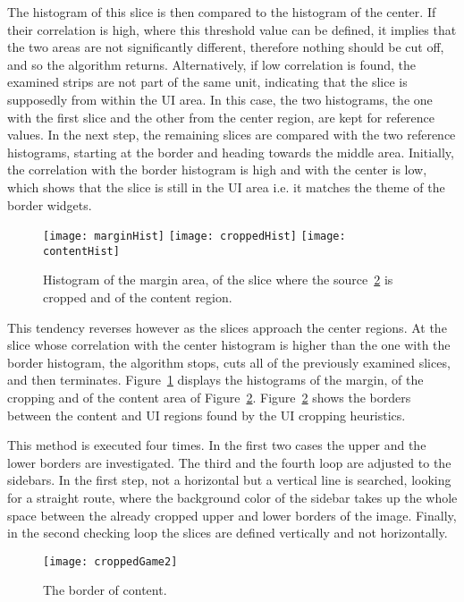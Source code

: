 \documentclass[draft,final]{vutinfth} %
\begin{document}
	The histogram of this slice is then compared to the histogram of the center.
	If their correlation is high, where this threshold value can be defined, it implies that the two areas are not significantly different, therefore nothing should be cut off, and so the algorithm returns.
	Alternatively, if low correlation is found, the examined strips are not part of the same unit, indicating that the slice is supposedly from within the UI area.
	In this case, the two histograms, the one with the first slice and the other from the center region, are kept for reference values.
	In the next step, the remaining slices are compared with the two reference histograms, starting at the border and heading towards the middle area.
	Initially, the correlation with the border histogram is high and with the center is low, which shows that the slice is still in the UI area i.e. it matches the theme of the border widgets.
	\begin{figure}[H]
		\texttt{[image: marginHist]}\hfill
		\texttt{[image: croppedHist]}\hfill
		\texttt{[image: contentHist]}
		\caption{Histogram of the margin area, of the slice where the source~\ref{fig:cropped} is cropped and of the content region.}
		\label{fig:hist}
	\end{figure}
	This tendency reverses however as the slices approach the center regions.
	At the slice whose correlation with the center histogram is higher than the one with the border histogram, the algorithm stops, cuts all of the previously examined slices, and then terminates.
	Figure~\ref{fig:hist} displays the histograms of the margin, of the cropping and of the content area of Figure~\ref{fig:cropped}.
	Figure~\ref{fig:cropped} shows the borders between the content and UI regions found by the UI cropping heuristics.\par 	
	This method is executed four times.
	In the first two cases the upper and the lower borders are investigated.
	The third and the fourth loop are adjusted to the sidebars.
	In the first step, not a horizontal but a vertical line is searched, looking for a straight route, where the background color of the sidebar takes up the whole space between the already cropped upper and lower borders of the image.
	Finally, in the second checking loop the slices are defined vertically and not horizontally.
	\begin{figure}[H]
		\centering		
		\texttt{[image: croppedGame2]}
		\caption{The border of content.}
		\label{fig:cropped}
	\end{figure}
\end{document}

